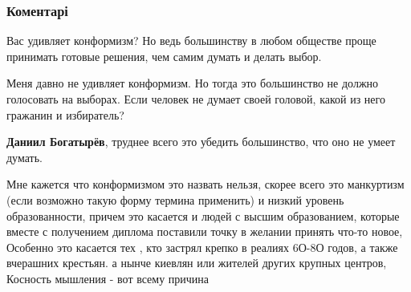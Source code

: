  
 
 
 
 
\subsubsection{Коментарі}

\begin{itemize}
 

Вас удивляет конформизм? Но ведь большинству в любом обществе проще принимать
готовые решения, чем самим думать и делать выбор.

\begin{itemize}
 

Меня давно не удивляет конформизм. Но тогда это большинство не должно
голосовать на выборах. Если человек не думает своей головой, какой из него
гражанин и избиратель?


 
\textbf{Даниил Богатырёв}, труднее всего это убедить большинство, что оно не умеет думать.

 

Мне кажется что конформизмом это назвать нельзя, скорее всего это манкуртизм
(если возможно такую форму термина применить) и низкий уровень образованности,
причем это касается и людей с высшим образованием, которые вместе с получением
диплома поставили точку в желании принять что-то новое, Особенно это касается
тех , кто застрял крепко в реалиях 6О-8О годов, а также вчерашних крестьян. а
нынче киевлян или жителей других крупных центров, Косность мышления - вот всему
причина



\end{itemize}
\end{itemize}
